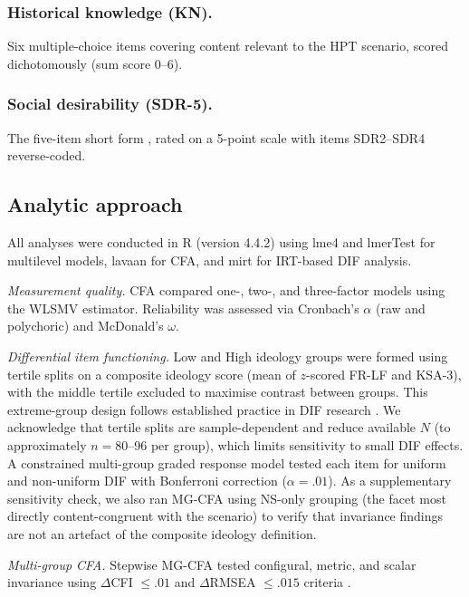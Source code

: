 \documentclass[pdflatex,sn-apa]{sn-jnl}%
\begin{document}
\subsubsection{Historical knowledge (KN).}\label{subsubsec:kn}

Six multiple-choice items covering content relevant to the HPT scenario, scored dichotomously (sum score 0--6).

\subsubsection{Social desirability (SDR-5).}\label{subsubsec:sdr}

The five-item short form \citep{Hays1989}, rated on a 5-point scale with items SDR2--SDR4 reverse-coded.

\subsection{Analytic approach}\label{subsec:analytic}

All analyses were conducted in R (version 4.4.2) using lme4 and lmerTest for multilevel models, lavaan for CFA, and mirt for IRT-based DIF analysis.

\emph{Measurement quality.} CFA compared one-, two-, and three-factor models using the WLSMV estimator. Reliability was assessed via Cronbach's $\alpha$ (raw and polychoric) and McDonald's $\omega$.

\emph{Differential item functioning.} Low and High ideology groups were formed using tertile splits on a composite ideology score (mean of $z$-scored FR-LF and KSA-3), with the middle tertile excluded to maximise contrast between groups. This extreme-group design follows established practice in DIF research \citep{Finch2005}. We acknowledge that tertile splits are sample-dependent and reduce available $N$ (to approximately $n = 80$--96 per group), which limits sensitivity to small DIF effects. A constrained multi-group graded response model tested each item for uniform and non-uniform DIF with Bonferroni correction ($\alpha = .01$). As a supplementary sensitivity check, we also ran MG-CFA using NS-only grouping (the facet most directly content-congruent with the scenario) to verify that invariance findings are not an artefact of the composite ideology definition.

\emph{Multi-group CFA.} Stepwise MG-CFA tested configural, metric, and scalar invariance using $\Delta$CFI $\leq .01$ and $\Delta$RMSEA $\leq .015$ criteria \citep{Chen2007, Cheung2002}.
\end{document}
